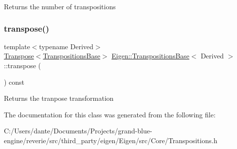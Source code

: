\begin{DoxyReturn}{Returns}
the number of transpositions 
\end{DoxyReturn}
\mbox{\label{class_eigen_1_1_transpositions_base_a2ddede41421797738fc58ee1074efb8f}} 
\subsubsection{\texorpdfstring{transpose()}{transpose()}}
{\footnotesize\ttfamily template$<$typename Derived$>$ \\
\mbox{\hyperlink{class_eigen_1_1_transpose}{Transpose}}$<$\mbox{\hyperlink{class_eigen_1_1_transpositions_base}{Transpositions\+Base}}$>$ \mbox{\hyperlink{class_eigen_1_1_transpositions_base}{Eigen\+::\+Transpositions\+Base}}$<$ Derived $>$\+::transpose (\begin{DoxyParamCaption}{ }\end{DoxyParamCaption}) const\hspace{0.3cm}{\ttfamily [inline]}}

\begin{DoxyReturn}{Returns}
the tranpose transformation 
\end{DoxyReturn}


The documentation for this class was generated from the following file\+:\begin{DoxyCompactItemize}
\item 
C\+:/\+Users/dante/\+Documents/\+Projects/grand-\/blue-\/engine/reverie/src/third\+\_\+party/eigen/\+Eigen/src/\+Core/Transpositions.\+h\end{DoxyCompactItemize}
